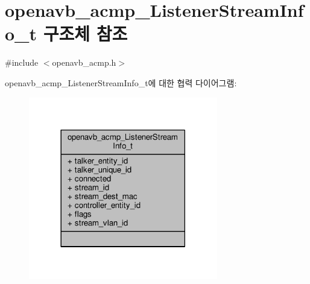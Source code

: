 \hypertarget{structopenavb__acmp___listener_stream_info__t}{}\section{openavb\+\_\+acmp\+\_\+\+Listener\+Stream\+Info\+\_\+t 구조체 참조}
\label{structopenavb__acmp___listener_stream_info__t}


{\ttfamily \#include $<$openavb\+\_\+acmp.\+h$>$}



openavb\+\_\+acmp\+\_\+\+Listener\+Stream\+Info\+\_\+t에 대한 협력 다이어그램\+:
\nopagebreak
\begin{figure}[H]
\begin{center}
\leavevmode
\includegraphics[width=234pt]{structopenavb__acmp___listener_stream_info__t__coll__graph}
\end{center}
\end{figure}
